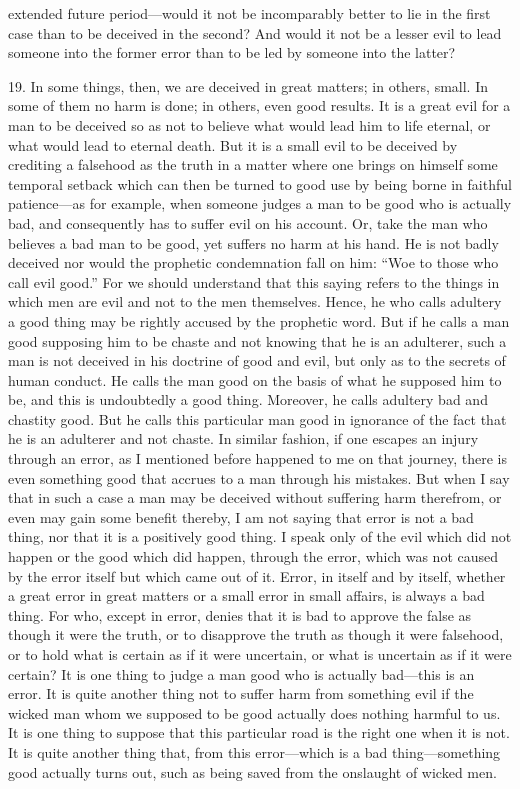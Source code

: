 extended future period—would it not be incomparably better to lie in the first case than to be deceived in the second? And would it not be a lesser evil to lead someone into the former error than to be led by someone into the latter?

19. In some things, then, we are deceived in great matters; in others, small. In some of them no harm is done; in others, even good results. It is a great evil for a man to be deceived so as not to believe what would lead him to life eternal, or what would lead to eternal death. But it is a small evil to be deceived by crediting a falsehood as the truth in a matter where one brings on himself some temporal setback which can then be turned to good use by being borne in faithful patience—as for example, when someone judges a man to be good who is actually bad, and consequently has to suffer evil on his account. Or, take the man who believes a bad man to be good, yet suffers no harm at his hand. He is not badly deceived nor would the prophetic condemnation fall on him: ``Woe to those who call evil good.'' For we should understand that this saying refers to the things in which men are evil and not to the men themselves. Hence, he who calls adultery a good thing may be rightly accused by the prophetic word. But if he calls a man good supposing him to be chaste and not knowing that he is an adulterer, such a man is not deceived in his doctrine of good and evil, but only as to the secrets of human conduct. He calls the man good on the basis of what he supposed him to be, and this is undoubtedly a good thing. Moreover, he calls adultery bad and chastity good. But he calls this particular man good in ignorance of the fact that he is an adulterer and not chaste. In similar fashion, if one escapes an injury through an error, as I mentioned before happened to me on that journey, there is even something good that accrues to a man through his mistakes. But when I say that in such a case a man may be deceived without suffering harm therefrom, or even may gain some benefit thereby, I am not saying that error is not a bad thing, nor that it is a positively good thing. I speak only of the evil which did not happen or the good which did happen, through the error, which was not caused by the error itself but which came out of it. Error, in itself and by itself, whether a great error in great matters or a small error in small affairs, is always a bad thing. For who, except in error, denies that it is bad to approve the false as though it were the truth, or to disapprove the truth as though it were falsehood, or to hold what is certain as if it were uncertain, or what is uncertain as if it were certain? It is one thing to judge a man good who is actually bad—this is an error. It is quite another thing not to suffer harm from something evil if the wicked man whom we supposed to be good actually does nothing harmful to us. It is one thing to suppose that this particular road is the right one when it is not. It is quite another thing that, from this error—which is a bad thing—something good actually turns out, such as being saved from the onslaught of wicked men.

